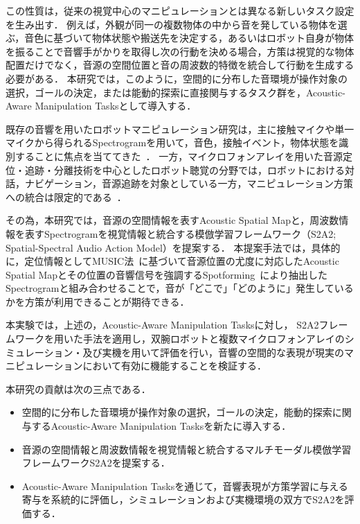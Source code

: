 \documentclass{article}
\begin{document}
この性質は，従来の視覚中心のマニピュレーションとは異なる新しいタスク設定を生み出す．
例えば，外観が同一の複数物体の中から音を発している物体を選ぶ，音色に基づいて物体状態や搬送先を決定する，あるいはロボット自身が物体を振ることで音響手がかりを取得し次の行動を決める場合，方策は視覚的な物体配置だけでなく，音源の空間位置と音の周波数的特徴を統合して行動を生成する必要がある．
本研究では，このように，空間的に分布した音環境が操作対象の選択，ゴールの決定，または能動的探索に直接関与するタスク群を，Acoustic-Aware Manipulation Tasksとして導入する．

既存の音響を用いたロボットマニピュレーション研究は，主に接触マイクや単一マイクから得られるSpectrogramを用いて，音色，接触イベント，物体状態を識別することに焦点を当ててきた~\citep{playitbyear,seehearfeel,maniwav,hearingtouch2024,audiovla}．
一方，マイクロフォンアレイを用いた音源定位・追跡・分離技術を中心としたロボット聴覚の分野では，ロボットにおける対話，ナビゲーション，音源追跡を対象としている一方，マニピュレーション方策への統合は限定的である~\citep{valin2004ssl,evers2018aslam,nakadai2010hark,nakadai2020robotaudition,robotaudition_review2025}．

その為，本研究では，音源の空間情報を表すAcoustic Spatial Mapと，周波数情報を表すSpectrogramを視覚情報と統合する模倣学習フレームワーク（S2A2; Spatial-Spectral Audio Action Model）を提案する．
本提案手法では，具体的に，定位情報としてMUSIC法~\citep{schmidt1986music,doa_survey2025}に基づいて音源位置の尤度に対応したAcoustic Spatial Mapとその位置の音響信号を強調するSpotforming~\citep{spotforming_nmf}により抽出したSpectrogramと組み合わせることで，音が「どこで」「どのように」発生しているかを方策が利用できることが期待できる．

本実験では，上述の，Acoustic-Aware Manipulation Tasksに対し，
S2A2フレームワークを用いた手法を適用し，双腕ロボットと複数マイクロフォンアレイのシミュレーション・及び実機を用いて評価を行い，音響の空間的な表現が現実のマニピュレーションにおいて有効に機能することを検証する．

本研究の貢献は次の三点である．

\begin{itemize}
	\item 空間的に分布した音環境が操作対象の選択，ゴールの決定，能動的探索に関与するAcoustic-Aware Manipulation Tasksを新たに導入する．
	\item 音源の空間情報と周波数情報を視覚情報と統合するマルチモーダル模倣学習フレームワークS2A2を提案する．
	\item Acoustic-Aware Manipulation Tasksを通じて，音響表現が方策学習に与える寄与を系統的に評価し，シミュレーションおよび実機環境の双方でS2A2を評価する．
\end{itemize}
\end{document}
